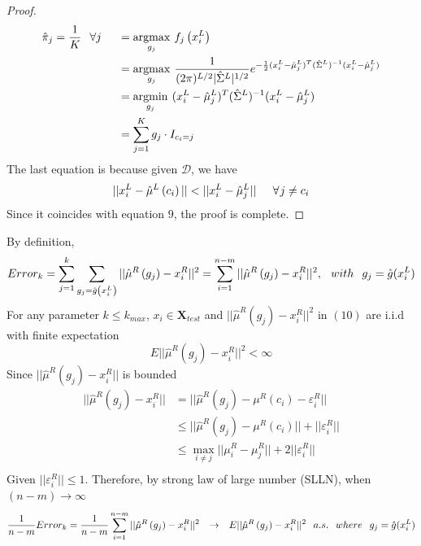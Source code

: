 \documentclass[11pt]{article}
\begin{document}
\begin{proof}
\begin{align}
   \hat{\pi}_j = \frac{1}{K} \hspace{0.1in}\forall j  \hspace{0.2in} & = \underset{g_j}{\operatorname{argmax}}\hspace{0.05 in} f_j\left(x^L_i\right) \nonumber  \nonumber  \\    
     & = \underset{g_j}{\operatorname{argmax}}\hspace{0.05 in}  \frac{1}{(2\pi)^{L/2}|\hat{\Sigma}^L|^{1/2}}e^{-\frac{1}{2}(x^L_i-\hat{\mu}^L_j)^T(\hat{\Sigma}^{L})^{-1}(x^L_i-\hat{\mu}^L_j)	} \nonumber  \\  
     &=  \underset{g_j}{\operatorname{argmin}}\hspace{0.05 in} (x^L_i-\hat{\mu}^L_j)^T(\hat{\Sigma}^{L})^{-1}(x^L_i-\hat{\mu}^L_j) \nonumber   \\   \nonumber 
     &= \sum^K_{j=1} g_j \cdot I_{c_i=j}
\end{align}
The last equation is because given $\mathcal{D}$, we have
\[||x^L_i-\hat{\mu}^L \left(c_i\right)|| < ||x^L_i-\hat{\mu}^L_{j}||\hspace{0.2 in}\forall \hspace{0.01 in}j\neq c_i\]
Since it coincides with equation $9$, the proof is complete. 
\end{proof}
\vspace{0.3in}
\noindent
By definition,
\begin{equation}
Error_k = \sum^k_{j=1} \sum_{g_j = \hat{g} \left(x^L_i\right)} ||\hat{\mu}^R \left(g_j\right) - x^R_i||^2 = \sum^{n-m}_{i=1} ||\hat{\mu}^R \left(g_j\right) - x^R_i||^2, \hspace{0.1in}with\hspace{0.1in} g_j = \hat{g}(x^L_i)
\end{equation}
\noindent
For any parameter $k\leq k_{max}$, $x_i \in \mathbf{X}_{test}$ and $||\hat{\mu}^R \left(g_j\right) - x^R_i||^2$ in $(10)$ are i.i.d with finite expectation
\[
E||\hat{\mu}^R \left(g_j\right) - x^R_i||^2 < \infty
\]
Since $||\hat{\mu}^R \left(g_j\right) - x^R_i||$ is bounded 
\begin{align} \nonumber 
||\hat{\mu}^R \left(g_j\right) - x^R_i|| & = ||\hat{\mu}^R \left(g_j\right) - \mu^R(c_i)- \varepsilon^R_i|| \\ \nonumber 
&\leq ||\hat{\mu}^R \left(g_j\right) - \mu^R(c_i)|| + ||\varepsilon^R_i||\\ \nonumber 
&\leq \max_{i\neq j}||\mu^R_i - \mu^R_j|| + 2||\varepsilon^R_i||\\ \nonumber 
\end{align}
Given $||\varepsilon^R_i||\leq 1$.
Therefore, by strong law of large number (SLLN), when $(n-m) \to \infty$
\begin{equation}
\frac{1}{n-m} Error_k = \frac{1}{n-m}\sum^{n-m}_{i=1}||\hat{\mu}^R \left(g_j\right) - x^R_i||^2 \hspace{0.1in}  \to \hspace{0.1in} E||\hat{\mu}^R \left(g_j\right) - x^R_i||^2 \hspace{0.1in}a.s. \hspace{0.1in} where \hspace{0.1in} g_j = \hat{g}(x^L_i)
\end{equation}
\end{document}
